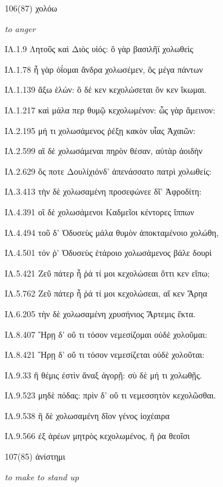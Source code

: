 \begin{enumerate}
{ΙΛ.11.717 ἀλλὰ μάλ' ἐσσυμένους πολεμίζειν. οὐδέ με Νηλεὺς

}

\clearpage
\item[\large 106(87)]{\large \g χολόω}

\hspace{0.2cm} \textit{ to anger  }

{\g
ΙΛ.1.9 Λητοῦς καὶ Διὸς υἱός: ὃ γὰρ βασιλῆϊ χολωθεὶς

ΙΛ.1.78 ἦ γὰρ ὀΐομαι ἄνδρα χολωσέμεν, ὃς μέγα πάντων

ΙΛ.1.139 ἄξω ἑλών: ὃ δέ κεν κεχολώσεται ὅν κεν ἵκωμαι.

ΙΛ.1.217 καὶ μάλα περ θυμῷ κεχολωμένον: ὧς γὰρ ἄμεινον:

ΙΛ.2.195 μή τι χολωσάμενος ῥέξῃ κακὸν υἷας Ἀχαιῶν:

ΙΛ.2.599 αἳ δὲ χολωσάμεναι πηρὸν θέσαν, αὐτὰρ ἀοιδὴν

ΙΛ.2.629 ὅς ποτε Δουλίχιόνδ' ἀπενάσσατο πατρὶ χολωθείς:

ΙΛ.3.413 τὴν δὲ χολωσαμένη προσεφώνεε δῖ' Ἀφροδίτη:

ΙΛ.4.391 οἳ δὲ χολωσάμενοι Καδμεῖοι κέντορες ἵππων

ΙΛ.4.494 τοῦ δ' Ὀδυσεὺς μάλα θυμὸν ἀποκταμένοιο χολώθη,

ΙΛ.4.501 τόν ῥ' Ὀδυσεὺς ἑτάροιο χολωσάμενος βάλε δουρὶ

ΙΛ.5.421 Ζεῦ πάτερ ἦ ῥά τί μοι κεχολώσεαι ὅττι κεν εἴπω;

ΙΛ.5.762 Ζεῦ πάτερ ἦ ῥά τί μοι κεχολώσεαι, αἴ κεν Ἄρηα

ΙΛ.6.205 τὴν δὲ χολωσαμένη χρυσήνιος Ἄρτεμις ἔκτα.

ΙΛ.8.407 Ἥρῃ δ' οὔ τι τόσον νεμεσίζομαι οὐδὲ χολοῦμαι:

ΙΛ.8.421 Ἥρῃ δ' οὔ τι τόσον νεμεσίζεται οὐδὲ χολοῦται:

ΙΛ.9.33 ἣ θέμις ἐστὶν ἄναξ ἀγορῇ: σὺ δὲ μή τι χολωθῇς.

ΙΛ.9.523 μηδὲ πόδας: πρὶν δ' οὔ τι νεμεσσητὸν κεχολῶσθαι.

ΙΛ.9.538 ἣ δὲ χολωσαμένη δῖον γένος ἰοχέαιρα

ΙΛ.9.566 ἐξ ἀρέων μητρὸς κεχολωμένος, ἥ ῥα θεοῖσι

}

\clearpage
\item[\large 107(85)]{\large \g ἀνίστημι}

\hspace{0.2cm} \textit{ to make to stand up }


\end{enumerate}
